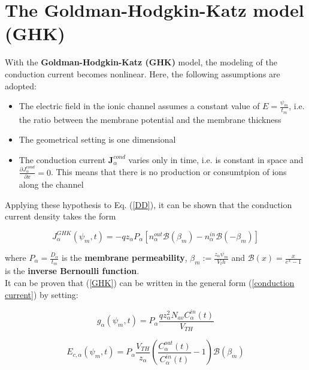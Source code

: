 \documentclass[12pt, a4paper]{report}
\begin{document}
\section{The Goldman-Hodgkin-Katz model (GHK)}
With the \textbf{Goldman-Hodgkin-Katz (GHK)} model, the modeling of the conduction current becomes nonlinear. Here, the following assumptions are adopted: 

\begin{itemize}
	
	\item The electric field in the ionic channel assumes a constant value of $ E = \frac{\psi_m}{t_m}$, i.e. the ratio between the membrane potential and the membrane thickness
	
	\item The geometrical setting is one dimensional
	
	\item The conduction current $\textbf{J}_{\alpha}^{cond}$ varies only in time, i.e. is constant in space and $ \frac{\partial J_{\alpha}^{cond} }{\partial x} = 0$. This means that there is no production or consumtpion of ions along the channel
	
\end{itemize}

Applying these hypothesis to Eq. (\ref{DD}), it can be shown that the conduction current density takes the form

\begin{equation}
J_{\alpha}^{GHK}(\psi_m,t) = -qz_{\alpha}P_{\alpha}\left[n_{\alpha}^{out} \mathcal{B}(\beta_m) - n_{\alpha}^{in} \mathcal{B}(-\beta_m) \right] \label{GHK}
\end{equation}

where $P_{\alpha} = \frac{D_{\alpha}}{t_m}$ is the \textbf{membrane permeability}, $ \beta_m := \frac{z_{\alpha} \psi_m}{V_th}$ and $ \mathcal{B}(x) = \frac{x}{e^x -1}$ is the \textbf{inverse Bernoulli function}.\\
It can be proven \cite{35} that (\ref{GHK}) can be written in the general form (\ref{conduction current}) by setting:

\begin{equation}
g_{\alpha}(\psi_m,t) = P_{\alpha}\frac{q z_{\alpha}^2N_{av}C_{\alpha}^{in}(t)}{V_{TH}} 
\end{equation}

\begin{equation}
E_{c,\alpha}(\psi_m,t) = P_{\alpha}\frac{V_{TH}}{z_{\alpha}} \left(\frac{C_{\alpha}^{out}(t)}{C_{\alpha}^{in}(t)} - 1\right)\mathcal{B}(\beta_m)
\end{equation}
\end{document}
